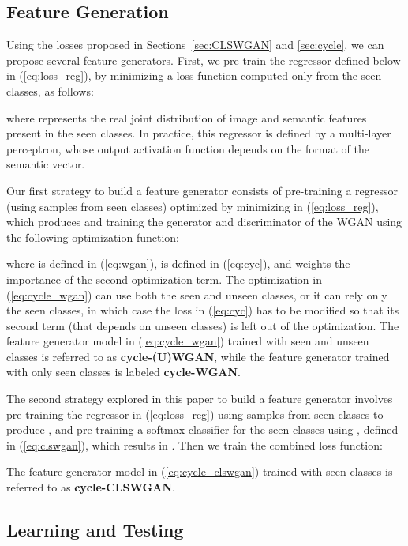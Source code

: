 \documentclass[runningheads]{llncs}
\begin{document}
\subsection{Feature Generation}
\label{sec:feature}

Using the losses proposed in Sections~\ref{sec:CLSWGAN} and \ref{sec:cycle}, we can propose several feature generators.  First, we pre-train the regressor  defined below in (\ref{eq:loss_reg}), by minimizing a loss function computed only from the seen classes, as follows:



where  represents the real joint distribution of image and semantic features present in the seen classes.  In practice, this regressor is defined by a multi-layer perceptron, whose output activation function  depends on the format of the semantic vector.

Our first strategy to build a feature generator consists of pre-training a regressor (using samples from seen classes) optimized by minimizing  in (\ref{eq:loss_reg}), which produces  and training the generator and discriminator of the WGAN using the following optimization function:

where  is defined in (\ref{eq:wgan}),  is defined in (\ref{eq:cyc}), and  weights the importance of the second optimization term.  The optimization in (\ref{eq:cycle_wgan}) can use both the seen and unseen classes, or it can rely only the seen classes, in which case the loss  in (\ref{eq:cyc}) has to be modified so that its second term (that depends on unseen classes) is left out of the optimization.  The feature generator model in (\ref{eq:cycle_wgan}) trained with seen and unseen classes is referred to as \textbf{cycle-(U)WGAN}, while the  feature generator trained with only seen classes is labeled \textbf{cycle-WGAN}.

The second strategy explored in this paper to build a feature generator involves pre-training the regressor in (\ref{eq:loss_reg}) using samples from seen classes to produce , and pre-training a softmax classifier for the seen classes using , defined in (\ref{eq:clswgan}), which results in .  Then we train the combined loss function:

The feature generator model in (\ref{eq:cycle_clswgan}) trained with seen classes is referred to as \textbf{cycle-CLSWGAN}.

\subsection{Learning and Testing}
\label{sec:classifier}
\end{document}
